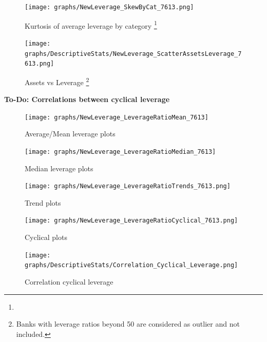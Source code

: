 \documentclass[12pt, a4paper]{article} %
\begin{document}
\begin{figure}[hbtp]
\begin{minipage}{\textwidth}
\centering
\caption[1]{Kurtosis of average leverage by category \footnote{}}
\texttt{[image: graphs/NewLeverage\_SkewByCat\_7613.png]}
\label{fig:averageLeverage_skew_Categories}
\end{minipage}
\end{figure}



\begin{figure}[hbtp]
\begin{minipage}{\textwidth}
\centering
\caption[1]{Assets vs Leverage \footnote{Banks with leverage ratios beyond 50 are considered as outlier and not included.}}
\texttt{[image: graphs/DescriptiveStats/NewLeverage\_ScatterAssetsLeverage\_7613.png]}
\label{fig:AssetsvsLeverage}
\end{minipage}
\end{figure}


\textbf{To-Do: Correlations between cyclical leverage}

\iffalse

\begin{figure}[hbtp]
\centering
\caption{Average/Mean leverage plots}
\texttt{[image: graphs/NewLeverage\_LeverageRatioMean\_7613]}
\end{figure}


\begin{figure}[hbtp]
\centering
\caption{Median leverage plots}
\texttt{[image: graphs/NewLeverage\_LeverageRatioMedian\_7613]}
\end{figure}



\begin{figure}[hbtp]
\centering
\caption{Trend plots}
\texttt{[image: graphs/NewLeverage\_LeverageRatioTrends\_7613.png]}
\end{figure}



\begin{figure}[hbtp]
\centering
\caption{Cyclical plots}
\texttt{[image: graphs/NewLeverage\_LeverageRatioCyclical\_7613.png]}
\end{figure}



\begin{figure}[hbtp]
\centering
\caption{Correlation cyclical leverage}
\texttt{[image: graphs/DescriptiveStats/Correlation\_Cyclical\_Leverage.png]}
\end{figure}
\end{document}
